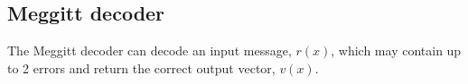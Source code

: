 \documentclass[Main]{subfiles}
\begin{document}
\subsection{Meggitt decoder}

The Meggitt decoder can decode an input message, $r(x)$, which may contain up to 2 errors and return the correct output vector, $v(x)$.
\end{document}
